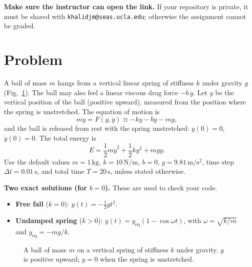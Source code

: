 \documentclass[letterpaper,11pt]{article}
\begin{document}
\textbf{Make sure the instructor can open the link.} If your repository is private, it must be shared with \texttt{khalidjm@seas.ucla.edu}; otherwise the assignment cannot be graded.

\section*{Problem}

A ball of mass $m$ hangs from a vertical linear spring of stiffness $k$ under gravity $g$ (Fig.~\ref{fig:model}). The ball may also feel a linear viscous drag force $-b\,\dot{y}$. Let $y$ be the vertical position of the ball (positive upward), measured from the position where the spring is unstretched. The equation of motion is
\begin{equation}
m \ddot{y} = F(y, \dot{y}) \equiv -k y - b \dot{y} - m g,
\label{eq:eom}
\end{equation}
and the ball is released from rest with the spring unstretched: $y(0) = 0$, $\dot{y}(0) = 0$. The total energy is
\begin{equation}
E = \frac{1}{2} m \dot{y}^2 + \frac{1}{2} k y^2 + m g y.
\label{eq:energy}
\end{equation}
Use the default values $m = 1\,\mathrm{kg}$, $k = 10\,\mathrm{N/m}$, $b = 0$, $g = 9.81\,\mathrm{m/s^2}$, time step $\Delta t = 0.01\,\mathrm{s}$, and total time $T = 20\,\mathrm{s}$, unless stated otherwise.

\textbf{Two exact solutions (for $b = 0$).} These are used to check your code.
\begin{itemize}
    \item \textbf{Free fall} ($k = 0$): $y(t) = -\frac{1}{2} g t^2$.
    \item \textbf{Undamped spring} ($k > 0$): $y(t) = y_{\text{eq}} \left( 1 - \cos \omega t \right)$, with $\omega = \sqrt{k/m}$ and $y_{\text{eq}} = -m g / k$.
\end{itemize}

\begin{figure}[h]
\centering
{}
\caption{A ball of mass $m$ on a vertical spring of stiffness $k$ under gravity. $y$ is positive upward; $y = 0$ when the spring is unstretched.}
\label{fig:model}
\end{figure}
\end{document}
